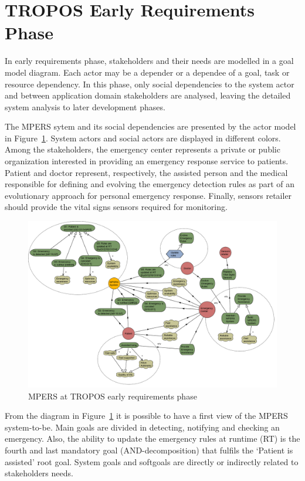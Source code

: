 \section{TROPOS Early Requirements Phase}

In early requirements phase, stakeholders and their needs are modelled in a goal model diagram. Each actor may be a depender or a dependee of a goal, task or resource dependency. In this phase, only social dependencies to the system actor and between application domain stakeholders are analysed, leaving the detailed system analysis to later development phases.

The MPERS sytem and its social dependencies are presented by the actor model in Figure~\ref{fig:MPERS_ER}. System actors and social actors are displayed in different colors. Among the stakeholders, the emergency center represents a private or public organization interested in providing an emergency response service to patients. Patient and doctor represent, respectively, the assisted person and the medical responsible for defining and evolving the emergency detection rules as part of an evolutionary approach for personal emergency response. Finally, sensors retailer should provide the vital signs sensors required for monitoring.

\begin{figure}[ht]
\centering
\includegraphics[width=1\textwidth]{imgs/MPERS_ER.png}
\caption{MPERS at TROPOS early requirements phase}
\label{fig:MPERS_ER}
\end{figure}

From the diagram in Figure~\ref{fig:MPERS_ER} it is possible to have a first view of the MPERS system-to-be. Main goals are divided in detecting, notifying and checking an emergency. Also, the ability to update the emergency rules at runtime (RT) is the fourth and last mandatory goal (AND-decomposition) that fulfils the `Patient is assisted' root goal. System goals and softgoals are directly or indirectly related to stakeholders needs.


